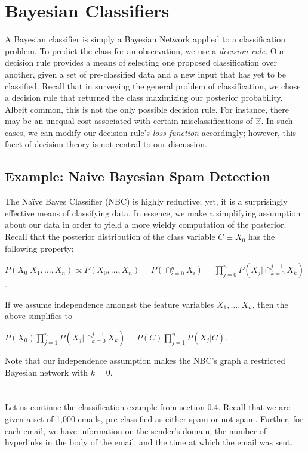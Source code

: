 \documentclass[12pt,twoside]{reedthesis}
\begin{document}
	\section{Bayesian Classifiers}
	A Bayesian classifier is simply a Bayesian Network applied to a classification problem. 
	To predict the class for an observation, we use a {\em decision rule}.
	Our decision rule provides a means of selecting one proposed classification over another, given a set of pre-classified data and a new input that has yet to be classified.
	Recall that in surveying the general problem of classification, we chose a decision rule that returned the class maximizing our posterior probability. 
	Albeit common, this is not the only possible decision rule. 
	For instance, there may be an unequal cost associated with certain misclassifications of $\vec{x}$. In such cases, we can modify our decision rule's {\em loss function} accordingly; however, this facet of decision theory is not central to our discussion.
	 
	\subsection*{Example: Naive Bayesian Spam Detection} %
	The Na\"{i}ve Bayes Classifier (NBC) is highly reductive; yet, it is a surprisingly effective means of classifying data. 
	In essence, we make a simplifying assumption about our data in order to yield a more wieldy computation of the posterior.
	Recall that the posterior distribution of the class variable $C \equiv X_0$ has the following property:
	\begin{center}
		$P(X_0 | X_1, \ldots , X_n) \propto
		P(X_0,\ldots,X_n) = 
		P( \displaystyle\cap_{i=0}^{n} X_i) = 
		\displaystyle\prod_{j=0}^{n} P(X_j | \displaystyle\cap_{k=0}^{j-1}X_k)$.
	\end{center}
	If we assume independence amongst the feature variables $X_1,\ldots,X_n$, then the above simplifies to
	\begin{center}
		$P(X_0) \displaystyle\prod_{j=1}^{n} P(X_j | \displaystyle\cap_{k=0}^{j-1}X_k)
		= P(C) \displaystyle\prod_{j=1}^{n} P(X_j | C)$.
	\end{center}
	Note that our independence assumption makes the NBC's graph a restricted Bayesian network with $k = 0$. \\ \\ \\ 
	
	Let us continue the classification example from section 0.4. Recall that we are given a set of 1,000 emails, pre-classified as either spam or not-spam. Further, for each email, we have information on the sender's domain, the number of hyperlinks in the body of the email, and the time at which the email was sent. 
	
\end{document}
